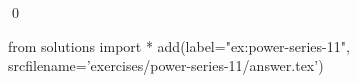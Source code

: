 \begin{ex}
  \label{ex:power-series-11}
  
  \qed
\end{ex}
\begin{python0}
from solutions import *
add(label="ex:power-series-11",
    srcfilename='exercises/power-series-11/answer.tex') 
\end{python0}                              
